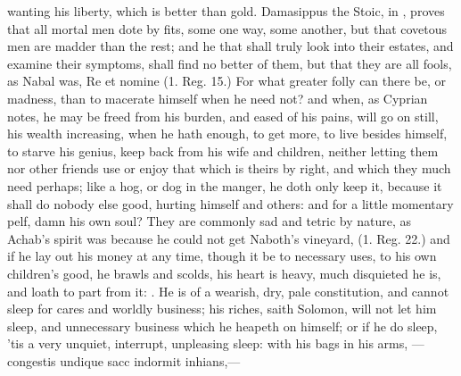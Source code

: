 {{wanting his liberty, which is better than gold. Damasippus the Stoic,
in \Horace{}, proves that all mortal men dote by fits, some one way, some
another, but that covetous men are madder than the rest; and he
that shall truly look into their estates, and examine their symptoms,
shall find no better of them, but that they are all fools, as
Nabal was, Re et nomine (1. Reg. 15.) For what greater folly can there
be, or  madness, than to macerate himself when he need not? and
when, as Cyprian notes, he may be freed from his burden, and
eased of his pains, will go on still, his wealth increasing, when he
hath enough, to get more, to live besides himself, to starve his
genius, keep back from his wife and children, neither letting
them nor other friends use or enjoy that which is theirs by right, and
which they much need perhaps; like a hog, or dog in the manger, he doth
only keep it, because it shall do nobody else good, hurting himself and
others: and for a little momentary pelf, damn his own soul? They are
commonly sad and tetric by nature, as Achab's spirit was because he
could not get Naboth's vineyard, (1. Reg. 22.) and if he lay out his
money at any time, though it be to necessary uses, to his own
children's good, he brawls and scolds, his heart is heavy, much
disquieted he is, and loath to part from it: . He is of a wearish, dry, pale constitution, and cannot sleep
for cares and worldly business; his riches, saith Solomon, will not let
him sleep, and unnecessary business which he heapeth on himself; or if
he do sleep, 'tis a very unquiet, interrupt, unpleasing sleep: with his
bags in his arms,
---congestis undique sacc
indormit inhians,---

}}
